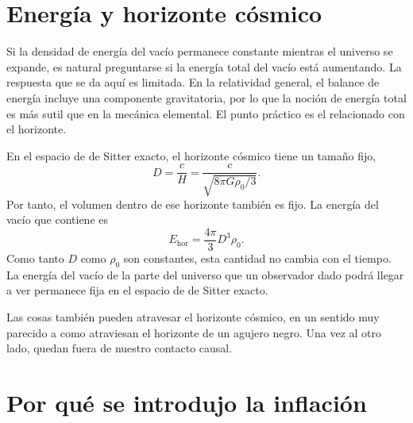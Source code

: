 \section{Energía y horizonte cósmico}

Si la densidad de energía del vacío permanece constante mientras el universo se expande, es natural preguntarse si la energía total del vacío está aumentando. La respuesta que se da aquí es limitada. En la relatividad general, el balance de energía incluye una componente gravitatoria, por lo que la noción de energía total es más sutil que en la mecánica elemental. El punto práctico es el relacionado con el horizonte.

En el espacio de de Sitter exacto, el horizonte cósmico tiene un tamaño fijo,
\begin{equation}
D=\frac{c}{H}
=\frac{c}{\sqrt{8\pi G\rho_0/3}}.
\end{equation}
Por tanto, el volumen dentro de ese horizonte también es fijo. La energía del vacío que contiene es
\begin{equation}
E_{\mathrm{hor}}=\frac{4\pi}{3}D^3\rho_0.
\end{equation}
Como tanto \(D\) como \(\rho_0\) son constantes, esta cantidad no cambia con el tiempo. La energía del vacío de la parte del universo que un observador dado podrá llegar a ver permanece fija en el espacio de de Sitter exacto.

Las cosas también pueden atravesar el horizonte cósmico, en un sentido muy parecido a como atraviesan el horizonte de un agujero negro. Una vez al otro lado, quedan fuera de nuestro contacto causal.

\begin{classroomqa}
\end{classroomqa}

\section{Por qué se introdujo la inflación}

